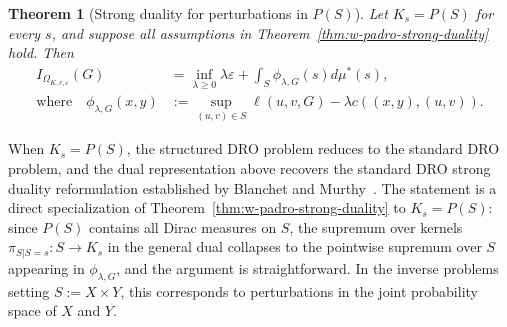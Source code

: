 \documentclass{article}
\newcommand{\R}{\mathbb{R}} %
\newcommand{\Okc}{\Omega_{K, c, \varepsilon}}
\newcommand{\D}{\Delta_{G,\ell, c}}
\newcommand{\phifix}{\phi_{\lambda, G}}
\newtheorem{theorem}{Theorem}[section]
\theoremstyle{definition}
\theoremstyle{remarksty}
\begin{document}
\begin{theorem}[Strong duality for perturbations in $P(S)$]\label{th:k=p(s)}
    Let $K_s=P(S)$ for every $s$, and suppose all assumptions in Theorem~\ref{thm:w-padro-strong-duality} hold. Then
    \begin{align*}
        I_{\Okc} (G) &= \inf_{\lambda \geq 0} \lambda \varepsilon +  \int_{S} \phifix(s) d\mu^*(s), \\
        \text{where} \quad \phifix (x,y) &:= \sup_{(u,v) \in S} \ell(u,v,G) - \lambda c((x,y),(u,v)).
    \end{align*}
\end{theorem}

When $K_s=P(S)$, the structured DRO problem reduces to the standard DRO problem, and the dual representation above recovers the standard DRO strong duality reformulation established by Blanchet and Murthy~\cite[Theorem~1b]{blanchet_quantifying_2019}. The statement is a direct specialization of Theorem~\ref{thm:w-padro-strong-duality} to $K_s=P(S)$: since $P(S)$ contains all Dirac measures on $S$, the supremum over kernels $\pi_{S|S=s}:S\to K_s$ in the general dual collapses to the pointwise supremum over $S$ appearing in $\phifix$, and the argument is straightforward. In the inverse problems setting $S:=X\times Y$, this corresponds to perturbations in the joint probability space of $X$ and $Y$.
\end{document}
